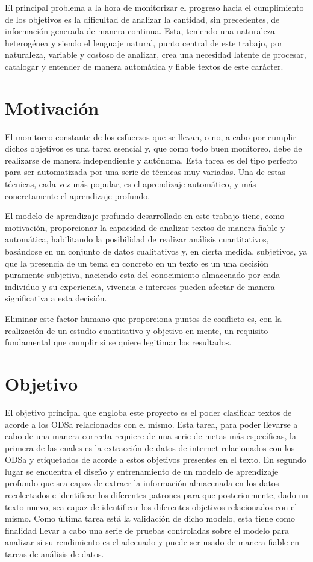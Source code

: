 El principal problema a la hora de monitorizar el progreso hacia el cumplimiento
de los objetivos es la dificultad de analizar la cantidad, sin precedentes, de
información generada de manera continua. Esta, teniendo una naturaleza
heterogénea y siendo el lenguaje natural, punto central de este trabajo, por
naturaleza, variable y costoso de analizar, crea una necesidad latente de
procesar, catalogar y entender de manera automática y fiable textos de este
carácter.

\section{Motivación}
El monitoreo constante de los esfuerzos que se llevan, o no, a cabo por cumplir
dichos objetivos es una tarea esencial y, que como todo buen monitoreo, debe de
realizarse de manera independiente y autónoma. Esta tarea es del tipo perfecto
para ser automatizada por una serie de técnicas muy variadas. Una de estas
técnicas, cada vez más popular, es el aprendizaje automático, y más
concretamente el aprendizaje profundo.

El modelo de aprendizaje profundo desarrollado en este trabajo tiene, como
motivación, proporcionar la capacidad de analizar textos de manera fiable y
automática, habilitando la posibilidad de realizar análisis cuantitativos,
basándose en un conjunto de datos cualitativos y, en cierta medida, subjetivos,
ya que la presencia de un tema en concreto en un texto es un una decisión
puramente subjetiva, naciendo esta del conocimiento almacenado por cada
individuo y su experiencia, vivencia e intereses pueden afectar de manera
significativa a esta decisión. 

Eliminar este factor humano que proporciona puntos de conflicto es, con la
realización de un estudio cuantitativo y objetivo en mente, un requisito
fundamental que cumplir si se quiere legitimar los resultados.

\section{Objetivo}
El objetivo principal que engloba este proyecto es el poder clasificar textos de acorde a los \gls{ODSa} relacionados con el mismo. Esta tarea, para poder llevarse a cabo de una manera correcta requiere de una serie de metas más específicas, la primera de las cuales es la extracción de datos de internet relacionados con los \gls{ODSa} y etiquetados de acorde a estos objetivos presentes en el texto. En segundo  lugar se  encuentra el diseño y entrenamiento de un modelo de aprendizaje profundo  que sea capaz de extraer la información almacenada en los datos recolectados e identificar los diferentes patrones para que posteriormente, dado un texto nuevo, sea capaz de identificar los diferentes objetivos relacionados con el mismo. Como última tarea está la validación de dicho modelo, esta tiene como finalidad llevar a cabo una serie de pruebas controladas sobre el modelo para analizar si su rendimiento es el adecuado y puede ser usado de manera fiable en tareas de análisis de datos. 

